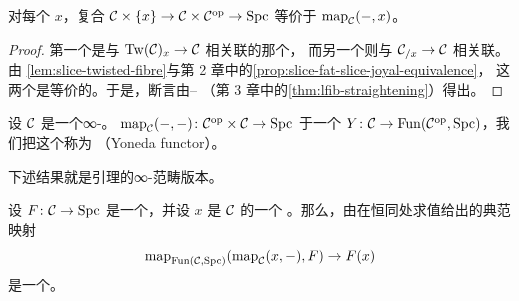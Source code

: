 \begin{corollary}\label{cor:fibre-composite-map}
对每个\trObject{} $x$，复合
$\mathcal{C} \times \{x\} \to \mathcal{C} \times \mathcal{C}^{\mathrm{op}} \to \mathrm{Spc}$
等价于\trFunctor{} $\mathrm{map}_{\mathcal{C}}(-, x)$。
\end{corollary}

\begin{proof}
第一个\trFunctor{}是与\trRightFibration{} $\mathrm{Tw}(\mathcal{C})_x \to \mathcal{C}$ 相关联的那个\trFunctor{}，
而另一个\trFunctor{}则与\trRightFibration{} $\mathcal{C}_{/x} \to \mathcal{C}$ 相关联。由%
\cref{lem:slice-twisted-fibre}与第 2 章中的\cref{prop:slice-fat-slice-joyal-equivalence}，
这两个\trRightFibration{}是等价的。于是，断言由\trStraightening{}--%
\trUnstraightening{}\trEquivalence{}（第 3 章中的\cref{thm:lfib-straightening}）得出。
\end{proof}

\begin{definition}\label{def:yoneda-functor}
设 $\mathcal{C}$ 是一个∞-\trCategory{}。\trFunctor{}%
$\mathrm{map}_{\mathcal{C}}(-, -)\colon \mathcal{C}^{\mathrm{op}} \times \mathcal{C} \to \mathrm{Spc}$
\trAdjunction{}于一个\trFunctor{}%
$Y\colon \mathcal{C} \to \mathrm{Fun}(\mathcal{C}^{\mathrm{op}}, \mathrm{Spc})$，我们把这个\trFunctor{}称为%
\emph{\trYoneda{}\trFunctor{}}（Yoneda functor）。
\end{definition}

下述结果就是\trYoneda{}引理的∞-范畴版本。

\begin{proposition}\label{prop:yoneda-lemma}
设 $F\colon \mathcal{C} \to \mathrm{Spc}$ 是一个\trFunctor{}，并设 $x$ 是 $\mathcal{C}$ 的一个%
\trObject{}。那么，由在恒同处求值给出的典范映射
\[
\mathrm{map}_{\mathrm{Fun}(\mathcal{C}, \mathrm{Spc})}(\mathrm{map}_{\mathcal{C}}(x, -), F) \to F(x)
\]
是一个\trEquivalence{}。
\end{proposition}

